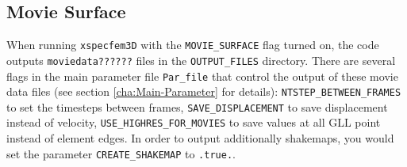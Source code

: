 \subsection{Movie Surface}

When running \texttt{xspecfem3D} with the \texttt{MOVIE\_SURFACE}
flag turned on, the code outputs \texttt{moviedata??????} files in
the \texttt{OUTPUT\_FILES} directory. There are several flags in the
main parameter file \texttt{Par\_file} that control the output of
these movie data files (see section \ref{cha:Main-Parameter} for
details):
\texttt{\small NTSTEP\_BETWEEN\_FRAMES} to set the
timesteps between frames,
\texttt{\small SAVE\_DISPLACEMENT}
to save displacement instead of velocity,
\texttt{\small USE\_HIGHRES\_FOR\_MOVIES}
to save values at all GLL point instead of element edges. In order
to output additionally shakemaps, you would set the parameter
\texttt{\small CREATE\_SHAKEMAP}
to \texttt{\small .true.}.

